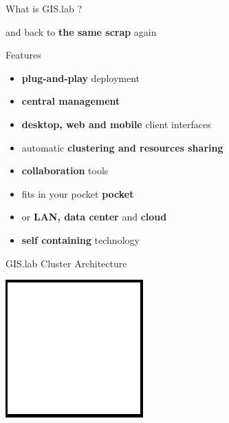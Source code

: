 \documentclass[12pt]{beamer}
\begin{document}
\begin{frame}{What is GIS.lab ?}
	\begin{center}
		and back to \textbf{the same scrap} again
	\end{center}
\end{frame}

\begin{frame}{Features}
	\begin{itemize}[<+->]
		\item \textbf{plug-and-play} deployment
		\item \textbf{central management}
		\item \textbf{desktop, web and mobile} client interfaces
		\item automatic \textbf{clustering and resources sharing}
		\item \textbf{collaboration} tools
		\item fits in your pocket \textbf{pocket}
		\item or \textbf{LAN, data center} and \textbf{cloud}
		\item \textbf{self containing} technology
	\end{itemize}
\end{frame}

\begin{frame}{GIS.lab Cluster Architecture}
	\begin{center}
		\includegraphics[keepaspectratio=true,height=0.5\textheight]{images/image.png}
	\end{center}
\end{frame}
\end{document}
